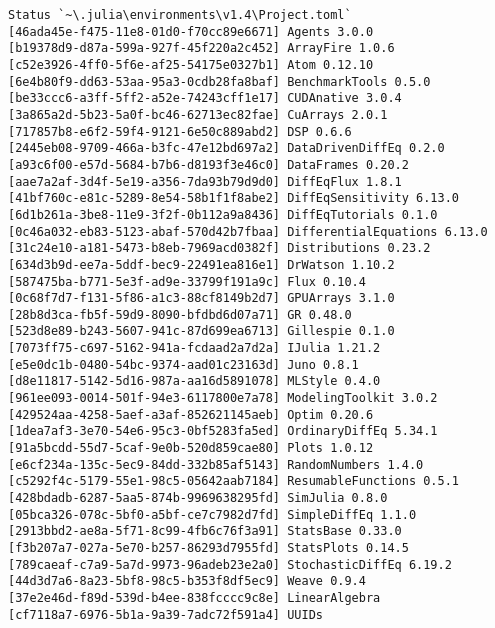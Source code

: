 \documentclass[12pt,a4paper]{article}
\begin{document}
\begin{verbatim}
Status `~\.julia\environments\v1.4\Project.toml`
[46ada45e-f475-11e8-01d0-f70cc89e6671] Agents 3.0.0
[b19378d9-d87a-599a-927f-45f220a2c452] ArrayFire 1.0.6
[c52e3926-4ff0-5f6e-af25-54175e0327b1] Atom 0.12.10
[6e4b80f9-dd63-53aa-95a3-0cdb28fa8baf] BenchmarkTools 0.5.0
[be33ccc6-a3ff-5ff2-a52e-74243cff1e17] CUDAnative 3.0.4
[3a865a2d-5b23-5a0f-bc46-62713ec82fae] CuArrays 2.0.1
[717857b8-e6f2-59f4-9121-6e50c889abd2] DSP 0.6.6
[2445eb08-9709-466a-b3fc-47e12bd697a2] DataDrivenDiffEq 0.2.0
[a93c6f00-e57d-5684-b7b6-d8193f3e46c0] DataFrames 0.20.2
[aae7a2af-3d4f-5e19-a356-7da93b79d9d0] DiffEqFlux 1.8.1
[41bf760c-e81c-5289-8e54-58b1f1f8abe2] DiffEqSensitivity 6.13.0
[6d1b261a-3be8-11e9-3f2f-0b112a9a8436] DiffEqTutorials 0.1.0
[0c46a032-eb83-5123-abaf-570d42b7fbaa] DifferentialEquations 6.13.0
[31c24e10-a181-5473-b8eb-7969acd0382f] Distributions 0.23.2
[634d3b9d-ee7a-5ddf-bec9-22491ea816e1] DrWatson 1.10.2
[587475ba-b771-5e3f-ad9e-33799f191a9c] Flux 0.10.4
[0c68f7d7-f131-5f86-a1c3-88cf8149b2d7] GPUArrays 3.1.0
[28b8d3ca-fb5f-59d9-8090-bfdbd6d07a71] GR 0.48.0
[523d8e89-b243-5607-941c-87d699ea6713] Gillespie 0.1.0
[7073ff75-c697-5162-941a-fcdaad2a7d2a] IJulia 1.21.2
[e5e0dc1b-0480-54bc-9374-aad01c23163d] Juno 0.8.1
[d8e11817-5142-5d16-987a-aa16d5891078] MLStyle 0.4.0
[961ee093-0014-501f-94e3-6117800e7a78] ModelingToolkit 3.0.2
[429524aa-4258-5aef-a3af-852621145aeb] Optim 0.20.6
[1dea7af3-3e70-54e6-95c3-0bf5283fa5ed] OrdinaryDiffEq 5.34.1
[91a5bcdd-55d7-5caf-9e0b-520d859cae80] Plots 1.0.12
[e6cf234a-135c-5ec9-84dd-332b85af5143] RandomNumbers 1.4.0
[c5292f4c-5179-55e1-98c5-05642aab7184] ResumableFunctions 0.5.1
[428bdadb-6287-5aa5-874b-9969638295fd] SimJulia 0.8.0
[05bca326-078c-5bf0-a5bf-ce7c7982d7fd] SimpleDiffEq 1.1.0
[2913bbd2-ae8a-5f71-8c99-4fb6c76f3a91] StatsBase 0.33.0
[f3b207a7-027a-5e70-b257-86293d7955fd] StatsPlots 0.14.5
[789caeaf-c7a9-5a7d-9973-96adeb23e2a0] StochasticDiffEq 6.19.2
[44d3d7a6-8a23-5bf8-98c5-b353f8df5ec9] Weave 0.9.4
[37e2e46d-f89d-539d-b4ee-838fcccc9c8e] LinearAlgebra
[cf7118a7-6976-5b1a-9a39-7adc72f591a4] UUIDs
\end{verbatim}
\end{document}
